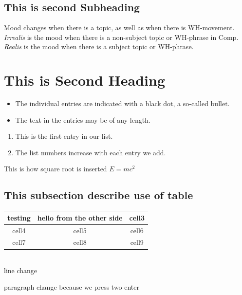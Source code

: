 \documentclass[12pt, A4]{article} %
\begin{document}
\subsection{This is second Subheading}

Mood changes when there is a topic, as well as when
there is WH-movement.  \emph{Irrealis} is the mood when
there is a non-subject topic or WH-phrase in Comp.
\emph{Realis} is the mood when there is a subject topic
or WH-phrase.

\newpage


\section{This is Second Heading}

\begin{itemize}
  \item The individual entries are indicated with a black dot, a so-called bullet.
  \item The text in the entries may be of any length. \\ %
\end{itemize}

\begin{enumerate}
  \item This is the first entry in our list.
  \item The list numbers increase with each entry we add. \\
\end{enumerate}

This is how square root is inserted $E=mc^2$ %

\subsection{This subsection describe use of table}

\begin{tabular}{|c| c| c|}
 \hline
 testing & hello from the other side & cell3 \\ 
 \hline 
 cell4 & cell5 & cell6\\  
 \hline 
 cell7 & cell8 & cell9 \\
 \hline    
\end{tabular} \\line change

paragraph change because we press two enter
\end{document}
